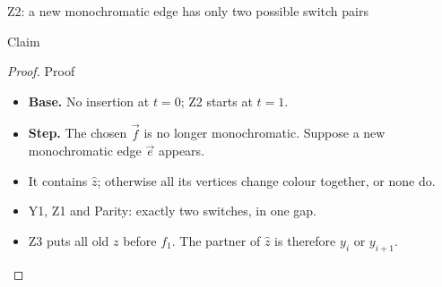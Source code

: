 \begin{frame}[t]{Z2: a new monochromatic edge has only two possible switch pairs}
  \footnotesize{}
  \claimreminder{\Yone\Zone\Zthree\switchparity\Zinsertnotation}
  \begin{lemma}{Claim}\Ztwo\end{lemma}
  \begin{proof}{Proof}
    \begin{itemize}[itemsep=4pt]
      \item<1-> \textbf{Base.} No insertion at $t=0$; Z2 starts at $t=1$.
      \item<2-> \textbf{Step.} The chosen $\vec f$ is no longer monochromatic.
        Suppose a new monochromatic edge $\vec e$ appears.
      \item<3-> It contains $\hat z$; otherwise all its vertices change colour together, or none do.
      \item<4-> Y1, Z1 and Parity: exactly two switches, in one gap.
      \item<5-> Z3 puts all old $z$ before $f_1$.
        The partner of $\hat z$ is therefore $y_i$ or $y_{i+1}$.
    \end{itemize}
  \end{proof}
  \begin{center}
  \end{center}
\end{frame}

